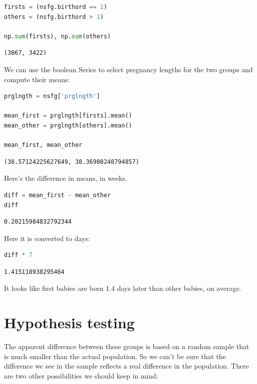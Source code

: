 \begin{lstlisting}[language=Python]
firsts = (nsfg.birthord == 1)
others = (nsfg.birthord > 1)

np.sum(firsts), np.sum(others)
\end{lstlisting}

\begin{lstlisting}[]
(3067, 3422)
\end{lstlisting}

We can use the boolean Series to select pregnancy lengths for the two
groups and compute their means:

\begin{lstlisting}[language=Python]
prglngth = nsfg['prglngth']

mean_first = prglngth[firsts].mean() 
mean_other = prglngth[others].mean()

mean_first, mean_other
\end{lstlisting}

\begin{lstlisting}[]
(38.57124225627649, 38.36908240794857)
\end{lstlisting}

Here's the difference in means, in weeks.

\begin{lstlisting}[language=Python]
diff = mean_first - mean_other
diff
\end{lstlisting}

\begin{lstlisting}[]
0.20215984832792344
\end{lstlisting}

Here it is converted to days:

\begin{lstlisting}[language=Python]
diff * 7
\end{lstlisting}

\begin{lstlisting}[]
1.415118938295464
\end{lstlisting}

It looks like first babies are born 1.4 days later than other babies, on
average.

\hypertarget{hypothesis-testing}{%
\section{Hypothesis testing}\label{hypothesis-testing}}

The apparent difference between these groups is based on a random sample
that is much smaller than the actual population. So we can't be sure
that the difference we see in the sample reflects a real difference in
the population. There are two other possibilities we should keep in
mind:

